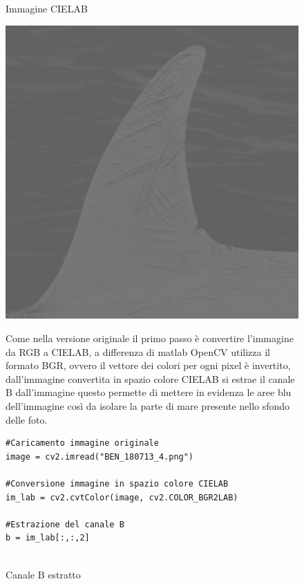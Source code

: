 \documentclass[a4paper,12pt]{report}
\begin{document}
\begin{figure}
\begin{minipage}{0.25\textwidth}
          \caption{Immagine CIELAB}
        \end{minipage}
        \begin{minipage}{0.25\textwidth}
          \centering
          \includegraphics[width=\textwidth]{assets/images/fin_extraction/test_b.png}  
          \caption{Canale B estratto}
        \end{minipage}

        \begin{flushleft}
          Come nella versione originale il primo passo è convertire l'immagine da RGB a CIELAB, 
          a differenza di matlab OpenCV utilizza il formato BGR, ovvero il vettore dei colori per ogni pixel è invertito,
          dall'immagine convertita in spazio colore CIELAB si estrae il canale B dall'immagine questo permette di mettere in evidenza 
          le aree blu dell'immagine così da isolare la parte di mare presente nello sfondo delle foto.
          
        \begin{lstlisting}
#Caricamento immagine originale
image = cv2.imread("BEN_180713_4.png")

#Conversione immagine in spazio colore CIELAB
im_lab = cv2.cvtColor(image, cv2.COLOR_BGR2LAB)

#Estrazione del canale B
b = im_lab[:,:,2]


\end{lstlisting}
\end{flushleft}
\end{figure}
\end{document}

